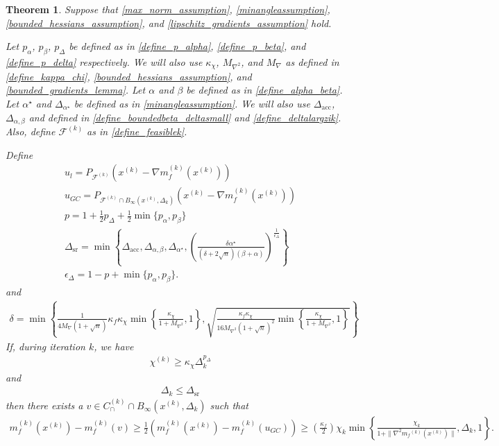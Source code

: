 \documentclass{article}
\newtheorem{theorem}{Theorem}[section]
\theoremstyle{case}
\newcommand{\capcones}{{C^{(k)}_{\cap}}}
\newcommand{\chik}{{\chi^{(k)}}}
\newcommand{\dacc}{{\Delta_{\text{acc}}}}
\newcommand{\deltalargzik}{{\Delta_{\alpha,\beta}}}
\newcommand{\dk}{\Delta_k}
\newcommand{\dsr}{{\Delta_{\text{sr}}}}
\newcommand{\feasiblek}{{\mathcal F^{(k)}}}
\newcommand{\gk}{{\nabla m_f^{(k)}(x^{(k)})}}
\newcommand{\maxgrad}{{M_{\nabla}}}
\newcommand{\maxhessian}{{M_{\nabla^2}}}
\newcommand{\mfk}{{{m}_f}^{(k)}}
\newcommand{\minanglealpha}{{ \alpha^{\star} }}
\newcommand{\minangledelta}{{\Delta_{\alpha^{\star}}}}
\newcommand{\tr}{{ B_{\infty}\left(\xk, \dk\right) }}
\newcommand{\xk}{{x^{(k)}}}
\begin{document}
\begin{theorem}
\label{sufficient_reduction_theorem}
Suppose that
\cref{max_norm_assumption},
\cref{minangleassumption},
\cref{bounded_hessians_assumption},
and 
\cref{lipschitz_gradients_assumption} hold.

Let
$p_{\alpha}$, $p_{\beta}$, $p_{\Delta}$
be defined as in \cref{define_p_alpha}, \cref{define_p_beta}, and \cref{define_p_delta} respectively.
We will also use
$\kappa_{\chi}$,
$\maxhessian$, and
$\maxgrad$ as defined in
\cref{define_kappa_chi},
\cref{bounded_hessians_assumption},
and \cref{bounded_gradients_lemma}.
Let $\alpha$ and $\beta$ be defined as in \cref{define_alpha_beta}.
Let $\minanglealpha$ and $\minangledelta$ be defined as in \cref{minangleassumption}.
We will also use $\dacc$, $\deltalargzik$ and defined in \cref{define_boundedbeta_deltasmall} and \cref{define_deltalargzik}.
Also, define $\feasiblek$ as in \cref{define_feasiblek}.

Define
\begin{align}
u_l = P_{\feasiblek}(\xk - \gk) \\
u_{GC} = P_{\feasiblek\cap\tr}(\xk-\gk) \\
p = 1 + \frac 1 2 p_{\Delta} + \frac 1 2\min\{p_{\alpha}, p_{\beta}\} \label{sr_def_p}\\
\dsr = \min\left\{
\dacc,
\deltalargzik,
\minangledelta,
\left(\frac{\delta \minanglealpha}{\left(\delta + 2\sqrt{n}\right)\left(\beta +\alpha\right)}\right)^{\frac 1 {\epsilon_{\Delta}}}
\right\} \label{define_delta_sufficient_reduction} \\
\epsilon_{\Delta} = 1-p+\min\{p_{\alpha}, p_{\beta}\}. \label{sr_def_epsilon_delta}
\end{align}
and
\begin{align}
\delta = \min\left\{
\frac 1 {4\maxgrad(1 + \sqrt{n})} \kappa_f \kappa_{\chi} \min\left\{ \frac{\kappa_{\chi}}{1 + \maxhessian}, 1 \right\},
\sqrt{\frac{\kappa_f \kappa_{\chi}}{16\maxhessian\left(1 + \sqrt{n}\right)^2} \min\left\{ \frac{\kappa_{\chi}}{1 + \maxhessian}, 1 \right\}}
\right\} \label{sr_define_delta}
\end{align}
If, during iteration $k$, we have
\begin{align}
\chik \ge \kappa_{\chi} \dk^{p_{\Delta}} \label{sr_chi_big_enough}
\end{align}
and
\begin{align}
\dk \le \dsr \label{sr_delta_small_enough}
\end{align}
then there exists a $v \in \capcones \cap \tr$ such that
\begin{align*}
m_f^{(k)}(\xk) - m_f^{(k)}(v) \ge \frac 1 2 \left(m_f^{(k)}(\xk) - m_f^{(k)}(u_{GC})\right) \ge \left(\frac{\kappa_f}{2} \right)\chi_k \min\left\{ \frac{\chi_k}{1+\|\nabla^2 \mfk(\xk)\|}, \dk, 1 \right\}.
\end{align*}
\end{theorem}
\end{document}

